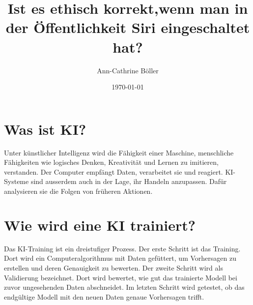 \documentclass{article}
\title{Ist es ethisch korrekt,wenn man in der Öffentlichkeit Siri eingeschaltet hat?}
\author{Ann-Cathrine Böller}
\date{\today}
\begin{document}
\maketitle


     

\tableofcontents

\section{Was ist KI?}
Unter künstlicher Intelligenz wird die Fähigkeit einer Maschine, menschliche Fähigkeiten wie logisches Denken, Kreativität und Lernen zu imitieren, verstanden.
Der Computer empfängt Daten, verarbeitet sie und reagiert. KI-Systeme sind ausserdem auch in der Lage, ihr Handeln anzupassen. Dafür analysieren sie die Folgen von früheren Aktionen.

\section{Wie wird eine KI trainiert?}
Das KI-Training ist ein dreistufiger Prozess. Der erste Schritt ist das Training. Dort wird ein Computeralgorithmus mit Daten gefüttert, um Vorhersagen zu erstellen und deren Genauigkeit zu bewerten. Der zweite Schritt wird als Validierung bezeichnet. Dort wird bewertet, wie gut das trainierte Modell bei zuvor ungesehenden Daten abschneidet. Im letzten Schritt wird getestet, ob das endgültige Modell mit den neuen Daten genaue Vorhersagen trifft.
\end{document}
